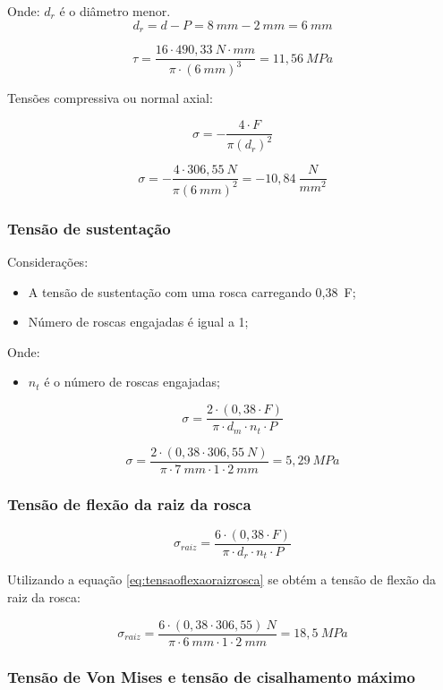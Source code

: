 Onde:
$d_{r}$ é o diâmetro menor.
$$d_{r} = d - P = 8~mm - 2~mm = 6~mm$$

$$\tau = \frac{16 \cdot 490,33~N \cdot mm}{\pi \cdot (6~mm)^{3}} = 11,56~MPa$$

Tensões compressiva ou normal axial:

$$\sigma = - \frac{4 \cdot F}{ \pi (d_{r})^{2}}$$

$$\sigma = - \frac{4 \cdot 306,55~N}{ \pi (6~mm)^{2}} = -10,84~\frac{N}{mm^{2}}$$

\subsubsection{Tensão de sustentação}

Considerações:
\begin{itemize}
    \item A tensão de sustentação com uma rosca carregando 0,38~F;
    \item Número de roscas engajadas é igual a 1;
\end{itemize}

Onde:
\begin{itemize}
    \item $n_{t}$ é o número de roscas engajadas;
\end{itemize}

$$\sigma = \frac{2 \cdot (0,38 \cdot F)}{\pi \cdot d_{m} \cdot n_{t} \cdot P}$$

$$\sigma = \frac{2 \cdot (0,38 \cdot 306,55~N)}{\pi \cdot 7~mm \cdot 1 \cdot 2~mm} = 5,29~MPa$$

\subsubsection{Tensão de flexão da raiz da rosca}

\begin{equation}\label{eq:tensaoflexaoraizrosca}
\sigma_{raiz} = \frac{6 \cdot (0,38 \cdot F)}{\pi \cdot d_{r} \cdot n_{t} \cdot P}
\end{equation}

Utilizando a equação \ref{eq:tensaoflexaoraizrosca} se obtém a tensão de flexão da raiz da rosca:

$$\sigma_{raiz} = \frac{6 \cdot (0,38 \cdot 306,55)~N}{\pi \cdot 6~mm \cdot 1 \cdot 2~mm} = 18,5~MPa$$

\subsubsection{Tensão de Von Mises e tensão de cisalhamento máximo}

